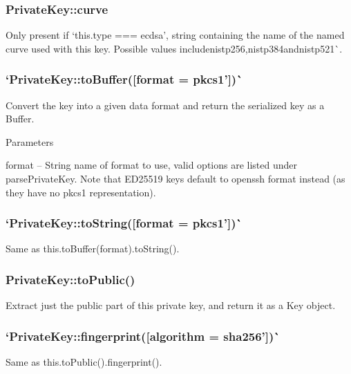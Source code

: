 \subsubsection*{{\ttfamily Private\+Key\+::curve}}

Only present if `this.\+type === \textquotesingle{}ecdsa'{\ttfamily , string containing the name of the named curve used with this key. Possible values include}nistp256{\ttfamily ,}nistp384{\ttfamily  and}nistp521\`{}.

\subsubsection*{`Private\+Key\+::to\+Buffer(\mbox{[}format = \textquotesingle{}pkcs1'\mbox{]})\`{}}

Convert the key into a given data format and return the serialized key as a Buffer.

Parameters


\begin{DoxyItemize}
\item {\ttfamily format} -- String name of format to use, valid options are listed under {\ttfamily parse\+Private\+Key}. Note that E\+D25519 keys default to {\ttfamily openssh} format instead (as they have no {\ttfamily pkcs1} representation).
\end{DoxyItemize}

\subsubsection*{`Private\+Key\+::to\+String(\mbox{[}format = \textquotesingle{}pkcs1'\mbox{]})\`{}}

Same as {\ttfamily this.\+to\+Buffer(format).to\+String()}.

\subsubsection*{{\ttfamily Private\+Key\+::to\+Public()}}

Extract just the public part of this private key, and return it as a {\ttfamily Key} object.

\subsubsection*{`Private\+Key\+::fingerprint(\mbox{[}algorithm = \textquotesingle{}sha256'\mbox{]})\`{}}

Same as {\ttfamily this.\+to\+Public().fingerprint()}.

